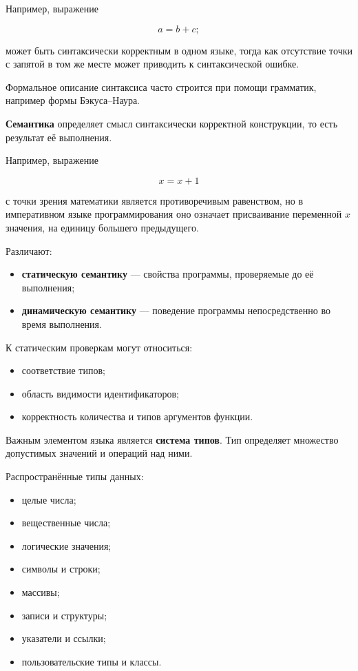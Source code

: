 Например, выражение

\[
a = b + c;
\]

может быть синтаксически корректным в одном языке, тогда как отсутствие точки с запятой в том же месте может приводить к синтаксической ошибке.

Формальное описание синтаксиса часто строится при помощи грамматик, например формы Бэкуса--Наура.

\textbf{Семантика} определяет смысл синтаксически корректной конструкции, то есть результат её выполнения.

Например, выражение

\[
x = x + 1
\]

с точки зрения математики является противоречивым равенством, но в императивном языке программирования оно означает присваивание переменной $x$ значения, на единицу большего предыдущего.

Различают:
\begin{itemize}
	\item \textbf{статическую семантику} --- свойства программы, проверяемые до её выполнения;
	\item \textbf{динамическую семантику} --- поведение программы непосредственно во время выполнения.
\end{itemize}

К статическим проверкам могут относиться:
\begin{itemize}
	\item соответствие типов;
	\item область видимости идентификаторов;
	\item корректность количества и типов аргументов функции.
\end{itemize}

Важным элементом языка является \textbf{система типов}. Тип определяет множество допустимых значений и операций над ними.

Распространённые типы данных:
\begin{itemize}
	\item целые числа;
	\item вещественные числа;
	\item логические значения;
	\item символы и строки;
	\item массивы;
	\item записи и структуры;
	\item указатели и ссылки;
	\item пользовательские типы и классы.
\end{itemize}

